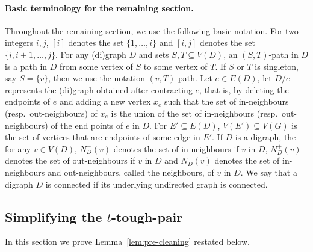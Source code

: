 \documentclass[a4paper,11pt]{article}
\theoremstyle{plain}
\newtheorem{identification rule}{Identification Rule}
\theoremstyle{definition}
\theoremstyle{remark}
\newcommand{\toughpair}{tough-pair}
\begin{document}
\paragraph*{Basic terminology for the remaining section.}Throughout the remaining section, we use the following basic notation. For two integers $i,j$, $[i]$ denotes the set $\{1, \ldots, i\}$ and $[i,j]$ denotes the set $\{i,i+1, \ldots,j\}$.  For any (di)graph $D$ and sets $S,T \subseteq V(D)$, an $(S,T)$-path in $D$ is a path in $D$ from some vertex of $S$ to some vertex of $T$. If $S$ or $T$ is singleton, say $S=\{v\}$, then we use the notation $(v,T)$-path. Let $e \in E(D)$, let $D/e$ represents the (di)graph obtained after contracting $e$, that is, by deleting the endpoints of $e$ and adding a new vertex $x_e$ such that the set of in-neighbours (resp.~out-neighbours) of $x_e$ is the union of the set of in-neighbours (resp.~out-neighbours) of the end points of $e$ in $D$. For $E' \subseteq E(D)$, $V(E') \subseteq V(G)$ is the set of vertices that are endpoints of some edge in $E'$. If $D$ is a digraph, the for any $v \in V(D)$, $N^-_D(v)$ denotes the set of in-neighbours if $v$ in $D$, $N^+_D(v)$ denotes the set of out-neighbours if $v$ in $D$ and $N_D(v)$ denotes the set of in-neighbours and out-neighbours, called the neighbours, of $v$ in $D$.
We say that a digraph $D$ is connected if its underlying undirected graph is connected. 
\subsection{Simplifying the $t$-\toughpair}\label{sec:firstramsey}

In this section we prove Lemma~\ref{lem:pre-cleaning} restated below.
\firstramsey*
\end{document}
